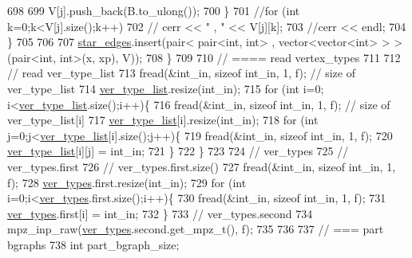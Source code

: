 \begin{DoxyCode}
698 
699         V[j].push\_back(B.to\_ulong());
700       \}
701       \textcolor{comment}{//for (int k=0;k<V[j].size();k++)}
702       \textcolor{comment}{//  cerr << " , " << V[j][k];}
703       \textcolor{comment}{//cerr << endl;}
704     \}
705 
706 
707     \hyperlink{classmarked__graph__compressed_a7df5779d313486644132bd816937f532}{star\_edges}.insert(pair< pair<int, int> , vector<vector<int> > > (pair<int, int>(x, xp), V));
708   \}
709 
710   \textcolor{comment}{// ==== read vertex\_types}
711 
712   \textcolor{comment}{// read ver\_type\_list}
713   fread(&int\_in, \textcolor{keyword}{sizeof} int\_in, 1, f); \textcolor{comment}{// size of ver\_type\_list}
714   \hyperlink{classmarked__graph__compressed_af2e3e55223d436628a02758dfae88493}{ver\_type\_list}.resize(int\_in);
715   \textcolor{keywordflow}{for} (\textcolor{keywordtype}{int} i=0; i<\hyperlink{classmarked__graph__compressed_af2e3e55223d436628a02758dfae88493}{ver\_type\_list}.size();i++)\{
716     fread(&int\_in, \textcolor{keyword}{sizeof} int\_in, 1, f); \textcolor{comment}{// size of ver\_type\_list[i]}
717     \hyperlink{classmarked__graph__compressed_af2e3e55223d436628a02758dfae88493}{ver\_type\_list}[i].resize(int\_in);
718     \textcolor{keywordflow}{for} (\textcolor{keywordtype}{int} j=0;j<\hyperlink{classmarked__graph__compressed_af2e3e55223d436628a02758dfae88493}{ver\_type\_list}[i].size();j++)\{
719       fread(&int\_in, \textcolor{keyword}{sizeof} int\_in, 1, f);
720       \hyperlink{classmarked__graph__compressed_af2e3e55223d436628a02758dfae88493}{ver\_type\_list}[i][j] = int\_in;
721     \}
722   \}
723 
724   \textcolor{comment}{// ver\_types}
725   \textcolor{comment}{// ver\_types.first}
726   \textcolor{comment}{// ver\_types.first.size()}
727   fread(&int\_in, \textcolor{keyword}{sizeof} int\_in, 1, f);
728   \hyperlink{classmarked__graph__compressed_af446cc5e23c241a92b76642fd5ebc403}{ver\_types}.first.resize(int\_in);
729   \textcolor{keywordflow}{for} (\textcolor{keywordtype}{int} i=0;i<\hyperlink{classmarked__graph__compressed_af446cc5e23c241a92b76642fd5ebc403}{ver\_types}.first.size();i++)\{
730     fread(&int\_in, \textcolor{keyword}{sizeof} int\_in, 1, f);
731     \hyperlink{classmarked__graph__compressed_af446cc5e23c241a92b76642fd5ebc403}{ver\_types}.first[i] = int\_in;
732   \}
733   \textcolor{comment}{// ver\_types.second}
734   mpz\_inp\_raw(\hyperlink{classmarked__graph__compressed_af446cc5e23c241a92b76642fd5ebc403}{ver\_types}.second.get\_mpz\_t(), f);
735 
736 
737   \textcolor{comment}{// === part bgraphs}
738   \textcolor{keywordtype}{int} part\_bgraph\_size;

\end{DoxyCode}
